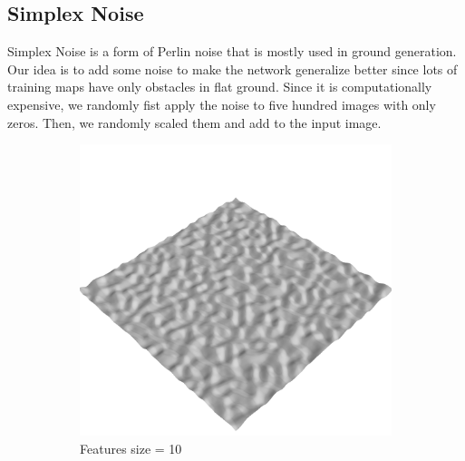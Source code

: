 \documentclass[../document.tex]{subfiles}
\begin{document}
\subsection{Simplex Noise} 
Simplex Noise is a form of Perlin noise that is mostly used in ground generation. Our idea is to add some noise to make the network generalize better since lots of training maps have only obstacles in flat ground. Since it is computationally expensive, we randomly fist apply the noise to five hundred images with only zeros. Then, we randomly scaled them and add to the input image. 
\begin{figure}[htbp]
    \centering

        \begin{subfigure}[b]{0.23\textwidth}
            \includegraphics[width=\textwidth]{../img/data-aug/3d/simplex1.png}
            \caption{Features size = 10}
        \end{subfigure}
        \begin{subfigure}[b]{0.23\linewidth}

\end{subfigure}
\end{figure}
\end{document}
